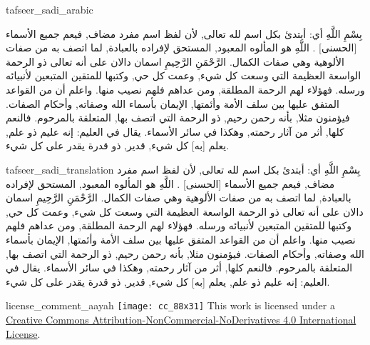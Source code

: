 \begin{taggedblock}{tafseer_sadi_arabic}
\begin{Arabic}
{ بِسْمِ اللَّهِ }
أي: أبتدئ بكل اسم لله تعالى, لأن لفظ
{ اسم }
مفرد مضاف, فيعم جميع الأسماء
[الحسنى]
.
{ اللَّهِ }
هو المألوه المعبود, المستحق لإفراده بالعبادة, لما اتصف به من صفات الألوهية وهي صفات الكمال.
{ الرَّحْمَنِ الرَّحِيمِ }
اسمان دالان على أنه تعالى ذو الرحمة الواسعة العظيمة التي وسعت كل شيء, وعمت كل حي, وكتبها للمتقين المتبعين لأنبيائه ورسله. فهؤلاء لهم الرحمة المطلقة, ومن عداهم فلهم نصيب منها. واعلم أن من القواعد المتفق عليها بين سلف الأمة وأئمتها, الإيمان بأسماء الله وصفاته, وأحكام الصفات. فيؤمنون مثلا, بأنه رحمن رحيم, ذو الرحمة التي اتصف بها, المتعلقة بالمرحوم. فالنعم كلها, أثر من آثار رحمته, وهكذا في سائر الأسماء. يقال في العليم: إنه عليم ذو علم, يعلم
[به]
كل شيء, قدير, ذو قدرة يقدر على كل شيء.
\end{Arabic}
\end{taggedblock}
\begin{taggedblock}{tafseer_sadi_translation}
{ بِسْمِ اللَّهِ }
أي: أبتدئ بكل اسم لله تعالى, لأن لفظ
{ اسم }
مفرد مضاف, فيعم جميع الأسماء
[الحسنى]
.
{ اللَّهِ }
هو المألوه المعبود, المستحق لإفراده بالعبادة, لما اتصف به من صفات الألوهية وهي صفات الكمال.
{ الرَّحْمَنِ الرَّحِيمِ }
اسمان دالان على أنه تعالى ذو الرحمة الواسعة العظيمة التي وسعت كل شيء, وعمت كل حي, وكتبها للمتقين المتبعين لأنبيائه ورسله. فهؤلاء لهم الرحمة المطلقة, ومن عداهم فلهم نصيب منها. واعلم أن من القواعد المتفق عليها بين سلف الأمة وأئمتها, الإيمان بأسماء الله وصفاته, وأحكام الصفات. فيؤمنون مثلا, بأنه رحمن رحيم, ذو الرحمة التي اتصف بها, المتعلقة بالمرحوم. فالنعم كلها, أثر من آثار رحمته, وهكذا في سائر الأسماء. يقال في العليم: إنه عليم ذو علم, يعلم
[به]
كل شيء, قدير, ذو قدرة يقدر على كل شيء.
\end{taggedblock}
\begin{taggedblock}{license_comment_aayah}
\texttt{[image: cc\_88x31]}
This work is licensed under a 
\href{http://creativecommons.org/licenses/by-nc-nd/4.0/}{Creative Commons Attribution-NonCommercial-NoDerivatives 4.0 International License}.
\end{taggedblock}
\begin{comment}
Please use the following for footnotes:- Sample\footnoteQ{Text of Qur'an footnote goes here.}.
Sample\footnoteT{Text of Tafseer footnote goes here.}.
\end{comment}